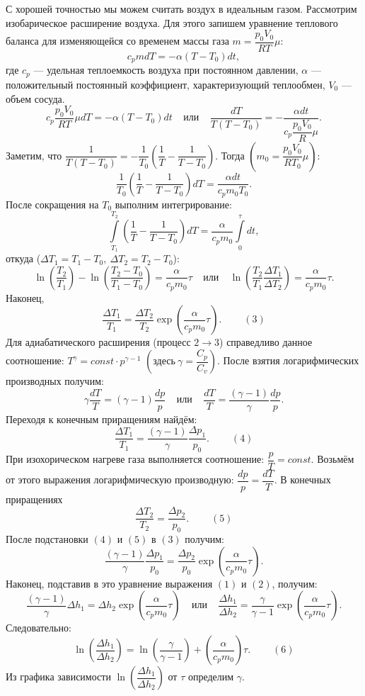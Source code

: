 \documentclass[a4paper,11.5pt]{article} %
\begin{document}
С хорошей точностью мы можем считать воздух в идеальным газом. Рассмотрим изобарическое расширение воздуха. Для этого запишем уравнение теплового баланса для изменяющейся со временем массы газа $m = \dfrac{p_0 V_0}{RT} \mu$:
$$c_p m dT = -\alpha (T-T_0)dt,$$
где $c_p$ --- удельная теплоемкость воздуха при постоянном давлении, $\alpha$ --- положительный постоянный коэффициент, характеризующий теплообмен, $V_0$ --- объем сосуда.
$$c_p \dfrac{p_0 V_0}{RT} \mu dT = -\alpha (T-T_0)dt ~~~~~ \text{или} ~~~~~ \dfrac{dT}{T(T - T_0)} = - \dfrac{\alpha dt}{c_p \dfrac{p_0 V_0}{R} \mu}.$$
Заметим, что $\dfrac{1}{T(T - T_0)} = -\dfrac{1}{T_0} \left(\dfrac{1}{T}-\dfrac{1}{T-T_0}\right)$. Тогда $\left(m_0 = \dfrac{p_0 V_0}{RT_0} \mu\right)$:$$\dfrac{1}{T_0} \left(\dfrac{1}{T}-\dfrac{1}{T-T_0}\right) dT = \dfrac{\alpha dt}{c_p m_0 T_0}.$$
После сокращения на $T_0$ выполним интегрирование:
$$\int\limits^{T_2}_{T_1}\left(\dfrac{1}{T}-\dfrac{1}{T-T_0}\right) dT = \dfrac{\alpha}{c_p m_0} \int\limits_0^\tau dt,$$ откуда ($\Delta T_1 = T_1 - T_0,~ \Delta T_2 = T_2 - T_0$): $$\ln \left(\dfrac{T_2}{T_1}\right) - \ln \left(\dfrac{T_2 - T_0}{T_1 - T_0}\right) = \dfrac{\alpha}{c_p m_0} \tau~~~~~\text{или}~~~~~ \ln \left(\dfrac{T_2}{T_1} \dfrac{\Delta T_1}{\Delta T_2}\right) = \dfrac{\alpha}{c_p m_0} \tau.$$
Наконец, $$\dfrac{\Delta T_1}{T_1} = \dfrac{\Delta T_2}{T_2} \exp{\left(\dfrac{\alpha}{c_p m_0} \tau\right)}.~~~~~~~~~~(3)$$
Для адиабатического расширения (процесс $2 \longrightarrow 3$) справедливо данное соотношение: $T^{\gamma} = const \cdot p^{\gamma - 1}$ $\left(\text{здесь}~ \gamma = \dfrac{C_p}{C_v}\right)$. После взятия логарифмических производных получим:
$$\gamma \dfrac{dT}{T} = (\gamma - 1)\dfrac{dp}{p} ~~~~~\text{или}~~~~~\dfrac{dT}{T} = \dfrac{(\gamma - 1)}{\gamma}\dfrac{dp}{p}.$$
Переходя к конечным приращениям найдём:
$$\dfrac{\Delta T_1}{T_1} = \dfrac{(\gamma - 1)}{\gamma}\dfrac{\Delta p_1}{p_0}.~~~~~~~~~~(4)$$
При изохорическом нагреве газа выполняется соотношение: $\dfrac{p}{T} = const$. Возьмём от этого выражения логарифмическую производную: $\dfrac{dp}{p} = \dfrac{dT}{T}$. В конечных приращениях
$$\dfrac{\Delta T_2}{T_2} = \dfrac{\Delta p_2}{p_0}.~~~~~~~~~~(5)$$
После подстановки $(4)$ и $(5)$ в $(3)$ получим:
$$\dfrac{(\gamma - 1)}{\gamma}\dfrac{\Delta p_1}{p_0} = \dfrac{\Delta p_2}{p_0} \exp{\left(\dfrac{\alpha}{c_p m_0} \tau\right)}.$$
Наконец, подставив в это уравнение выражения $(1)$ и $(2)$, получим:
$$\dfrac{(\gamma - 1)}{\gamma} \Delta h_1 = \Delta h_2 \exp{\left(\dfrac{\alpha}{c_p m_0} \tau\right)}~~~~~\text{или}~~~~~\dfrac{\Delta h_1}{\Delta h_2} = \dfrac{\gamma}{\gamma - 1} \exp{\left(\dfrac{\alpha}{c_p m_0} \tau\right)}.$$
Следовательно:
$$\ln \left(\dfrac{\Delta h_1}{\Delta h_2}\right) = \ln \left(\dfrac{\gamma}{\gamma - 1}\right) + \left(\dfrac{\alpha}{c_p m_0} \right) \tau.~~~~~~~~~~(6)$$
Из графика зависимости $\ln \left(\dfrac{\Delta h_1}{\Delta h_2}\right)$ от $\tau$ определим $\gamma$.
\end{document}
